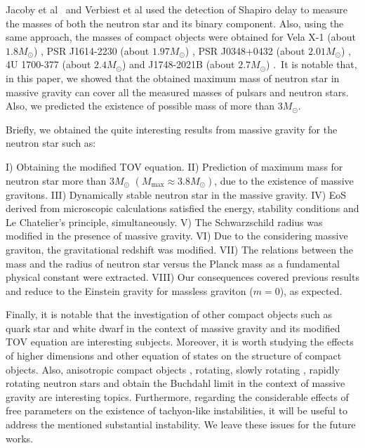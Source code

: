 \documentclass[aps]{revtex4}
\begin{document}
Jacoby et al \cite{Jacoby}\ and Verbiest et al \cite{Verbiest} used the
detection of Shapiro delay to measure the masses of both the neutron star
and its binary component. Also, using the same approach, the masses of
compact objects were obtained for Vela X-1 (about $1.8M_{\odot }$) \cite%
{Vela}, PSR J1614-2230 (about $1.97M_{\odot }$) \cite{PSRJ1}, PSR J0348+0432
(about $2.01M_{\odot }$) \cite{J0348}, 4U 1700-377 (about $2.4M_{\odot }$)
\cite{4U1700} and J1748-2021B (about $2.7M_{\odot }$) \cite{J1748}.\ It is
notable that, in this paper, we showed that the obtained maximum mass of
neutron star in massive gravity can cover all the measured masses of pulsars
and neutron stars. Also, we predicted the existence of possible mass of more
than $3M_{\odot}$.

Briefly, we obtained the quite interesting results from massive gravity for
the neutron star such as:

I) Obtaining the modified TOV equation. II) Prediction of maximum mass for
neutron star more than $3M_{\odot }$ $\left( M_{\max }\approx 3.8M_{\odot
}\right) $, due to the existence of massive gravitons. III) Dynamically
stable neutron star in the massive gravity. IV) EoS derived from microscopic
calculations satisfied the energy, stability conditions and Le Chatelier's
principle, simultaneously. V) The Schwarzschild radius was modified in the
presence of massive gravity. VI) Due to the considering massive graviton,
the gravitational redshift was modified. VII) The relations between the mass
and the radius of neutron star versus the Planck mass as a fundamental
physical constant were extracted. VIII) Our consequences covered previous
results and reduce to the Einstein gravity for massless graviton ($m=0$), as
expected.

Finally, it is notable that the investigation of other compact objects such
as quark star and white dwarf in the context of massive gravity and its
modified TOV equation are interesting subjects. Moreover, it is worth
studying the effects of higher dimensions and other equation of states on
the structure of compact objects. Also, anisotropic compact objects \cite%
{HarkoM,BoehmerH,SunzuM,PaulD,NgubelangaM,MauryaG,RatanpalTP}, rotating,
slowly rotating \cite%
{slowly1,slowly2,slowly3,slowly4,slowly5,slowly6,slowly7}, rapidly
rotating \cite{rapid1,rapid2,rapid3,rapid4,rapid5,rapid6} neutron
stars and obtain the Buchdahl limit
\cite{BI,Buchdahl1,Buchdahl2,Buchdahl3,BII,BIII,Buchdahl4} in the
context of massive gravity are interesting topics. Furthermore,
regarding the considerable effects of free parameters on the
existence of tachyon-like instabilities, it will be useful to
address the mentioned substantial instability. We leave these
issues for the future works.
\end{document}
